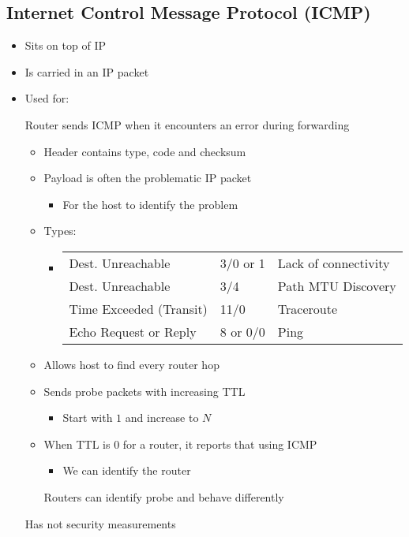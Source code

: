 \subsection{Internet Control Message Protocol (ICMP)}
\begin{itemize}
    \item Sits on top of IP
    \item Is carried in an IP packet
    \item Used for:
        \begin{itemize}
             Router sends ICMP when it encounters an error during forwarding
             
        \end{itemize}
        \begin{itemize}
            \item Header contains type, code and checksum
            \item Payload is often the problematic IP packet
                \begin{itemize}
                    \item For the host to identify the problem
                \end{itemize}
            \item Types:
                \begin{itemize}
                    \item
\begin{tabular}{| l | l | l}
    Dest. Unreachable & 3/0 or 1 & Lack of connectivity\\
    Dest. Unreachable & 3/4 & Path MTU Discovery\\
    Time Exceeded (Transit) & 11/0 & Traceroute\\
    Echo Request or Reply & 8 or 0/0 & Ping
\end{tabular}
                \end{itemize}
        \end{itemize}
        \begin{itemize}
            \item Allows host to find every router hop
            \item Sends probe packets with increasing TTL
                \begin{itemize}
                    \item Start with $1$ and increase to $N$
                \end{itemize}
            \item When TTL is $0$ for a router, it reports that using ICMP
                \begin{itemize}
                    \item We can identify the router
                \end{itemize}
            \icon Routers can identify probe and behave differently
        \end{itemize}
    \icon Has not security measurements
\end{itemize}

